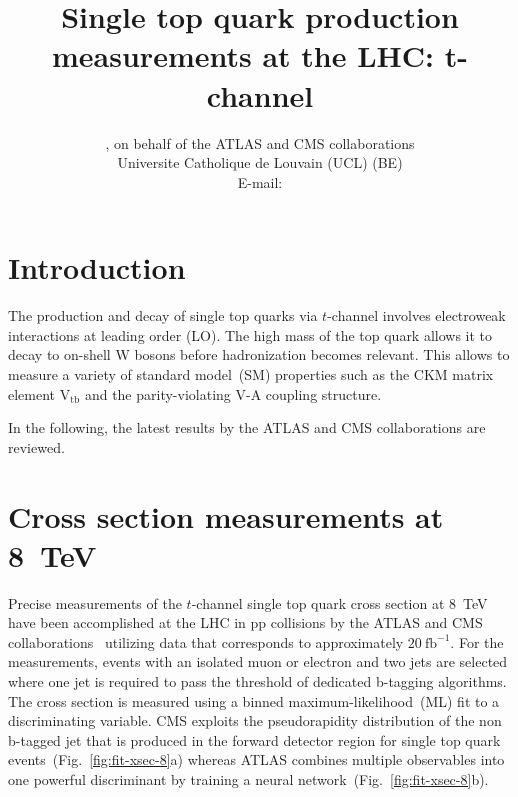 \documentclass{PoS}
\title{Single top quark production measurements at the LHC: t-channel}
\author{
    \speaker{Matthias Komm}, on behalf of the ATLAS and CMS collaborations\\
    Universite Catholique de Louvain (UCL) (BE)\\
    E-mail: \email{Matthias.Komm@cern.ch}
}
\begin{document}
\section{Introduction}
The production and decay of single top quarks via $t$-channel involves electroweak interactions at leading order (LO). The high mass of the top quark allows it to decay to on-shell W bosons before hadronization becomes relevant. This allows to measure a variety of standard model~(SM) properties such as the CKM matrix element $\mathrm{V_{tb}}$ and the parity-violating V-A coupling structure.

In the following, the latest results by the ATLAS and CMS collaborations are reviewed.

\section{Cross section measurements at 8~TeV}
Precise measurements of the $t$-channel single top quark cross section at 8~TeV have been accomplished at the LHC in pp collisions by the ATLAS and CMS collaborations~\cite{atlas-xsec8,cms-xsec8} utilizing data that corresponds to approximately $20~\mathrm{fb}^{-1}$. For the measurements, events with an isolated muon or electron and two jets are selected where one jet is required to pass the threshold of dedicated b-tagging algorithms. The cross section is measured using a binned maximum-likelihood~(ML) fit to a discriminating variable. CMS exploits the pseudorapidity distribution of the non b-tagged jet that is produced in the forward detector region for single top quark events~(Fig.~\ref{fig:fit-xsec-8}a) whereas ATLAS combines multiple observables into one powerful discriminant by training a neural network~(Fig.~\ref{fig:fit-xsec-8}b).
\end{document}
